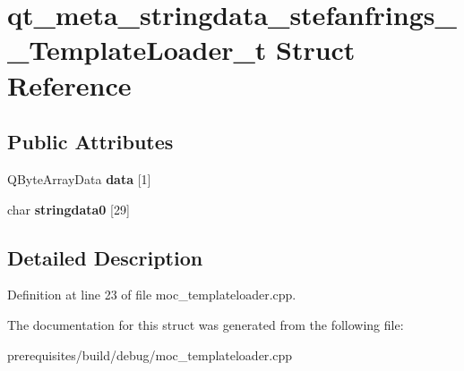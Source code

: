 \hypertarget{structqt__meta__stringdata__stefanfrings_____template_loader__t}{}\section{qt\+\_\+meta\+\_\+stringdata\+\_\+stefanfrings\+\_\+\+\_\+\+Template\+Loader\+\_\+t Struct Reference}
\label{structqt__meta__stringdata__stefanfrings_____template_loader__t}
\subsection*{Public Attributes}
\begin{DoxyCompactItemize}
\item 
\mbox{\label{structqt__meta__stringdata__stefanfrings_____template_loader__t_a4b98a85053376397b64e9327ad61bcd3}} 
Q\+Byte\+Array\+Data {\bfseries data} \mbox{[}1\mbox{]}
\item 
\mbox{\label{structqt__meta__stringdata__stefanfrings_____template_loader__t_ad5acdf280ee73f68d5d336fb0fef37bd}} 
char {\bfseries stringdata0} \mbox{[}29\mbox{]}
\end{DoxyCompactItemize}


\subsection{Detailed Description}


Definition at line 23 of file moc\+\_\+templateloader.\+cpp.



The documentation for this struct was generated from the following file\+:\begin{DoxyCompactItemize}
\item 
prerequisites/build/debug/moc\+\_\+templateloader.\+cpp\end{DoxyCompactItemize}
